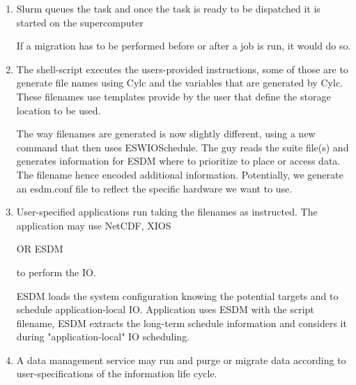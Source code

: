 \documentclass[a4paper]{article}
\begin{document}
{{\begin{enumerate}
  Then runs Slurm to queue the task.

  \item Slurm queues the task and once the task is ready to be dispatched it is started on the supercomputer

  If a migration has to be performed before or after a job is run, it would do so.

  \item The shell-script executes the users-provided instructions, some of those are to generate file names using Cylc and the variables that are generated by Cylc.
  These filenames use templates provide by the user that define the storage location to be used.

  The way filenames are generated is now slightly different, using a new command that then uses ESWIOSchedule.
  The guy reads the suite file(s) and generates information for ESDM where to prioritize to place or access data. The filename hence encoded additional information.
  Potentially, we generate an esdm.conf file to reflect the specific hardware we want to use.

  \item User-specified applications run taking the filenames as instructed.
    The application may use NetCDF, XIOS

    OR ESDM

    to perform the IO.

  ESDM loads the system configuration knowing the potential targets and to schedule application-local IO.
  Application uses ESDM with the script filename, ESDM extracts the long-term schedule information and considers it during "application-local" IO scheduling.

  \item A data management service may run and purge or migrate data according to user-specifications of the information life cycle.

\end{enumerate}


}}
\end{document}

